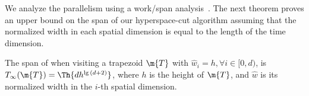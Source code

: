 We analyze the parallelism using a work/span
analysis~\cite[Ch.~27]{CormenLeRi+09}.  The next theorem proves an
upper bound on the span of our hyperspace-cut algorithm assuming that
the normalized width in each spatial dimension is equal to the length
of the time dimension.

\begin{theorem}
The span of  when visiting a trapezoid $\m{T}$ 
with ${\widehat{w}}_i = h, \forall{i} \in [0, d)$,
is $T_{\infty}(\m{T}) = \Th{dh^{\lg{(d + 2)}}}$, where 
$h$ is the height of $\m{T}$, and
${\widehat{w}}$ is its normalized width in the $i$-th 
spatial dimension.
\label{thm:HyperspaceCutSimpleCase}
\end{theorem}
%

